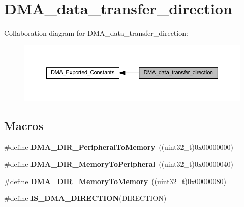 \hypertarget{group___d_m_a__data__transfer__direction}{}\section{D\+M\+A\+\_\+data\+\_\+transfer\+\_\+direction}
\label{group___d_m_a__data__transfer__direction}
Collaboration diagram for D\+M\+A\+\_\+data\+\_\+transfer\+\_\+direction\+:\nopagebreak
\begin{figure}[H]
\begin{center}
\leavevmode
\includegraphics[width=350pt]{group___d_m_a__data__transfer__direction}
\end{center}
\end{figure}
\subsection*{Macros}
\begin{DoxyCompactItemize}
\item 
\mbox{\label{group___d_m_a__data__transfer__direction_ga4d7847b57371eef92ec5da34511416a7}} 
\#define {\bfseries D\+M\+A\+\_\+\+D\+I\+R\+\_\+\+Peripheral\+To\+Memory}~((uint32\+\_\+t)0x00000000)
\item 
\mbox{\label{group___d_m_a__data__transfer__direction_gae1e6aa2722beb09b5be7140205244986}} 
\#define {\bfseries D\+M\+A\+\_\+\+D\+I\+R\+\_\+\+Memory\+To\+Peripheral}~((uint32\+\_\+t)0x00000040)
\item 
\mbox{\label{group___d_m_a__data__transfer__direction_gafb7d5b786f2fb56a903936cdc6d5e89a}} 
\#define {\bfseries D\+M\+A\+\_\+\+D\+I\+R\+\_\+\+Memory\+To\+Memory}~((uint32\+\_\+t)0x00000080)
\item 
\#define {\bfseries I\+S\+\_\+\+D\+M\+A\+\_\+\+D\+I\+R\+E\+C\+T\+I\+ON}(D\+I\+R\+E\+C\+T\+I\+ON)
\end{DoxyCompactItemize}


